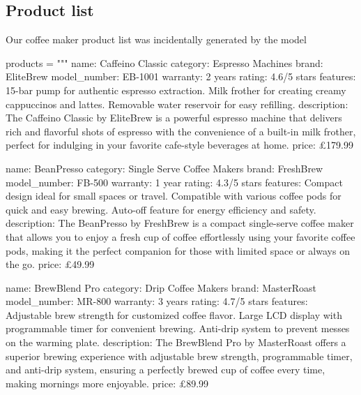 \documentclass[
  letterpaper,
  DIV=11,
  numbers=noendperiod]{scrreprt}
\newenvironment{Shaded}{\begin{snugshade}}{\end{snugshade}}
\newcommand{\NormalTok}[1]{\textcolor[rgb]{0.00,0.23,0.31}{#1}}
\newcommand{\OperatorTok}[1]{\textcolor[rgb]{0.37,0.37,0.37}{#1}}
\newcommand{\StringTok}[1]{\textcolor[rgb]{0.13,0.47,0.30}{#1}}
\begin{document}
\hypertarget{product-list}{%
\subsection{Product list}\label{product-list}}

Our coffee maker product list was incidentally generated by the model

\begin{Shaded}
\begin{Highlighting}[]
\NormalTok{products }\OperatorTok{=} \StringTok{"""}
\StringTok{name: Caffeino Classic}
\StringTok{category: Espresso Machines}
\StringTok{brand: EliteBrew}
\StringTok{model\_number: EB{-}1001}
\StringTok{warranty: 2 years}
\StringTok{rating: 4.6/5 stars}
\StringTok{features:}
\StringTok{  15{-}bar pump for authentic espresso extraction.}
\StringTok{  Milk frother for creating creamy cappuccinos and lattes.}
\StringTok{  Removable water reservoir for easy refilling.}
\StringTok{description: The Caffeino Classic by EliteBrew is a powerful espresso machine that delivers rich and flavorful shots of espresso with the convenience of a built{-}in milk frother, perfect for indulging in your favorite cafe{-}style beverages at home.}
\StringTok{price: £179.99}

\StringTok{name: BeanPresso}
\StringTok{category: Single Serve Coffee Makers}
\StringTok{brand: FreshBrew}
\StringTok{model\_number: FB{-}500}
\StringTok{warranty: 1 year}
\StringTok{rating: 4.3/5 stars}
\StringTok{features:}
\StringTok{  Compact design ideal for small spaces or travel.}
\StringTok{  Compatible with various coffee pods for quick and easy brewing.}
\StringTok{  Auto{-}off feature for energy efficiency and safety.}
\StringTok{description: The BeanPresso by FreshBrew is a compact single{-}serve coffee maker that allows you to enjoy a fresh cup of coffee effortlessly using your favorite coffee pods, making it the perfect companion for those with limited space or always on the go.}
\StringTok{price: £49.99}

\StringTok{name: BrewBlend Pro}
\StringTok{category: Drip Coffee Makers}
\StringTok{brand: MasterRoast}
\StringTok{model\_number: MR{-}800}
\StringTok{warranty: 3 years}
\StringTok{rating: 4.7/5 stars}
\StringTok{features:}
\StringTok{  Adjustable brew strength for customized coffee flavor.}
\StringTok{  Large LCD display with programmable timer for convenient brewing.}
\StringTok{  Anti{-}drip system to prevent messes on the warming plate.}
\StringTok{description: The BrewBlend Pro by MasterRoast offers a superior brewing experience with adjustable brew strength, programmable timer, and anti{-}drip system, ensuring a perfectly brewed cup of coffee every time, making mornings more enjoyable.}
\StringTok{price: £89.99}


\end{Highlighting}
\end{Shaded}
\end{document}
